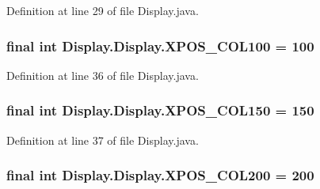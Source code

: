 Definition at line 29 of file Display.\+java.

\hypertarget{class_display_1_1_display_a0a8b9027490d3aa7d66834c6c12c0d35}{}
\subsubsection[{X\+P\+O\+S\+\_\+\+C\+O\+L100}]{\setlength{\rightskip}{0pt plus 5cm}final int Display.\+Display.\+X\+P\+O\+S\+\_\+\+C\+O\+L100 = 100\hspace{0.3cm}{\ttfamily [static]}}\label{class_display_1_1_display_a0a8b9027490d3aa7d66834c6c12c0d35}


Definition at line 36 of file Display.\+java.

\hypertarget{class_display_1_1_display_abc29a83a5afef24b6775c0c867d5ca2e}{}
\subsubsection[{X\+P\+O\+S\+\_\+\+C\+O\+L150}]{\setlength{\rightskip}{0pt plus 5cm}final int Display.\+Display.\+X\+P\+O\+S\+\_\+\+C\+O\+L150 = 150\hspace{0.3cm}{\ttfamily [static]}}\label{class_display_1_1_display_abc29a83a5afef24b6775c0c867d5ca2e}


Definition at line 37 of file Display.\+java.

\hypertarget{class_display_1_1_display_adbcb46204650409d834ab66950cdc370}{}
\subsubsection[{X\+P\+O\+S\+\_\+\+C\+O\+L200}]{\setlength{\rightskip}{0pt plus 5cm}final int Display.\+Display.\+X\+P\+O\+S\+\_\+\+C\+O\+L200 = 200\hspace{0.3cm}{\ttfamily [static]}}\label{class_display_1_1_display_adbcb46204650409d834ab66950cdc370}


